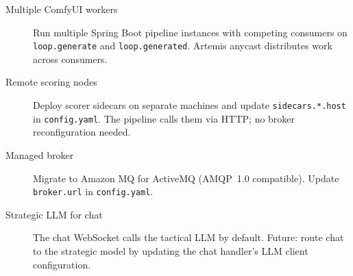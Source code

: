 \documentclass[11pt,letterpaper]{article}
\begin{document}
\begin{description}
  \item[Multiple ComfyUI workers] Run multiple Spring Boot pipeline instances
        with competing consumers on \texttt{loop.generate} and
        \texttt{loop.generated}. Artemis anycast distributes work across
        consumers.
  \item[Remote scoring nodes] Deploy scorer sidecars on separate machines and
        update \texttt{sidecars.*.host} in \texttt{config.yaml}. The pipeline
        calls them via HTTP; no broker reconfiguration needed.
  \item[Managed broker] Migrate to Amazon MQ for ActiveMQ (AMQP~1.0
        compatible). Update \texttt{broker.url} in \texttt{config.yaml}.
  \item[Strategic LLM for chat] The chat WebSocket calls the tactical LLM
        by default. Future: route chat to the strategic model by updating
        the chat handler's LLM client configuration.
\end{description}
\end{document}
